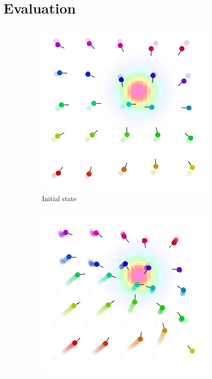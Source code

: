 \documentclass[conference]{IEEEtran}
\begin{document}
    
\section{Evaluation}
\label{sec:eval}

\begin{figure}[t]
  \centering
  \begin{subfigure}[b]{0.32\linewidth}
      \includegraphics[width=\textwidth]{imgs/start.png}
      \caption{Initial state}
      \label{fig:initial}
  \end{subfigure}
  \begin{subfigure}[b]{0.32\linewidth}
      \includegraphics[width=\textwidth]{imgs/after.png}

\end{subfigure}
\end{figure}
\end{document}
